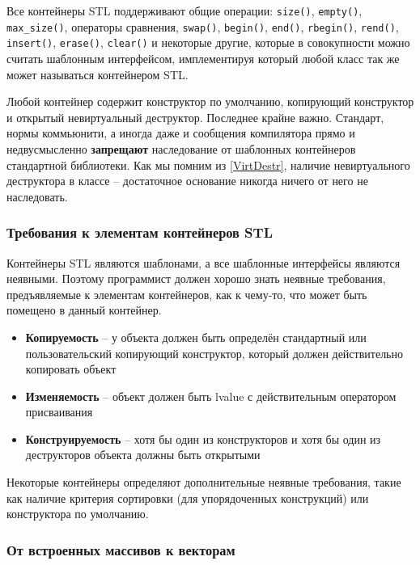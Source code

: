 \documentclass[a4paper,12pt,oneside]{article}
\begin{document}
Все контейнеры STL поддерживают общие операции: \lstinline!size()!, \lstinline!empty()!, \lstinline!max_size()!, операторы сравнения, \lstinline!swap()!, \lstinline!begin()!, \lstinline!end()!, \lstinline!rbegin()!, \lstinline!rend()!, \lstinline!insert()!, \lstinline!erase()!, \lstinline!clear()! и некоторые другие, которые в совокупности можно считать шаблонным интерфейсом, имплементируя который любой класс так же может называться контейнером STL.

Любой контейнер содержит конструктор по умолчанию, копирующий конструктор и открытый невиртуальный деструктор. Последнее крайне важно. Стандарт, нормы коммьюнити, а иногда даже и сообщения компилятора прямо и недвусмысленно \textbf{запрещают} наследование от шаблонных контейнеров стандартной библиотеки. Как мы помним из \ref{VirtDestr}, наличие невиртуального деструктора в классе -- достаточное основание никогда ничего от него не наследовать.

\subsubsection{Требования к элементам контейнеров STL}\label{STLReqs}

Контейнеры STL являются шаблонами, а все шаблонные интерфейсы являются неявными. Поэтому программист должен хорошо знать неявные требования, предъявляемые к элементам контейнеров, как к чему-то, что может быть помещено в данный контейнер.

\begin{itemize}
\item \textbf{Копируемость} -- у объекта должен быть определён стандартный или пользовательский копирующий конструктор, который должен действительно копировать объект
\item \textbf{Изменяемость} -- объект должен быть lvalue с действительным оператором присваивания
\item \textbf{Конструируемость} -- хотя бы один из конструкторов и хотя бы один из деструкторов объекта должны быть открытыми
\end{itemize}

Некоторые контейнеры определяют дополнительные неявные требования, такие как наличие критерия сортировки (для упорядоченных конструкций) или конструктора по умолчанию.

\subsubsection{От встроенных массивов к векторам}\label{vectorarrs}
\end{document}
